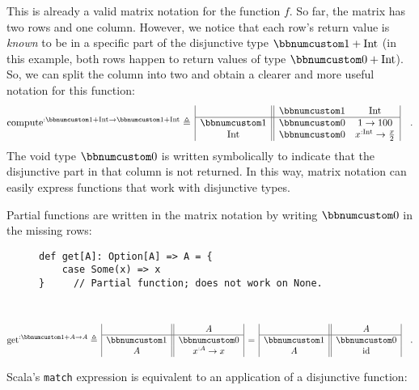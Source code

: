 This is already a valid matrix notation for the function $f$. So
far, the matrix has two rows and one column. However, we notice that
each row's return value is \emph{known} to be in a specific part of
the disjunctive type $\bbnum 1+\text{Int}$ (in this example, both
rows happen to return values of type $\bbnum 0+\text{Int}$). So,
we can split the column into two and obtain a clearer and more useful
notation for this function:
\[
\text{compute}^{:\bbnum 1+\text{Int}\rightarrow\bbnum 1+\text{Int}}\triangleq\,\begin{array}{|c||cc|}
 & \bbnum 1 & \text{Int}\\
\hline \bbnum 1 & \bbnum 0 & 1\rightarrow100\\
\text{Int} & \bbnum 0 & x^{:\text{Int}}\rightarrow\frac{x}{2}
\end{array}\quad.
\]
The void type $\bbnum 0$ is written symbolically to indicate that
the disjunctive part in that column is not returned. In this way,
matrix notation can easily express functions that work with disjunctive
types.

Partial functions are written in the matrix notation by writing $\bbnum 0$
in the missing rows:

\begin{wrapfigure}{l}{0.5\columnwidth}%
\vspace{-0.65\baselineskip}
\begin{lstlisting}
def get[A]: Option[A] => A = {
    case Some(x) => x
}     // Partial function; does not work on None.
\end{lstlisting}

\vspace{-0.75\baselineskip}
\end{wrapfigure}%

~\vspace{-1.35\baselineskip}
\[
\text{get}^{:\bbnum 1+A\rightarrow A}\triangleq\,\begin{array}{|c||c|}
 & A\\
\hline \bbnum 1 & \bbnum 0\\
A & x^{:A}\rightarrow x
\end{array}\,=\,\begin{array}{|c||c|}
 & A\\
\hline \bbnum 1 & \bbnum 0\\
A & \text{id}
\end{array}\quad.
\]
\vspace{-0.9\baselineskip}

Scala's \lstinline!match! expression is equivalent to an application
of a disjunctive function:

